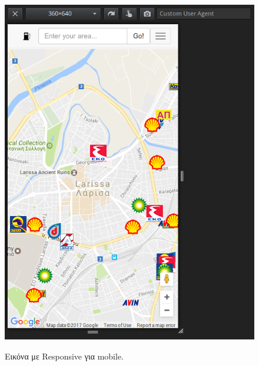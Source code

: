 \begin{figure}[H]
  \caption{Εικόνα με Responsive για mobile.}
  \centering
    \includegraphics[width=1\textwidth]{img/responsive-mobile-1.png}
    \label{fig:responsive1}
\end{figure}

